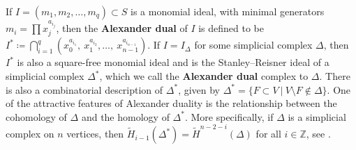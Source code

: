 \documentclass[12pt,leqno]{amsart}
\newtheorem{theorem}[lemma]{Theorem}
\theoremstyle{definition}
\begin{document}
If $I = (m_1, m_2, \dotsc, m_q) \subset S$ is a monomial ideal, with minimal
generators $m_i = \prod x_j^{a_{i_j}}$, then the \textbf{Alexander dual} of
$I$ is defined to be
$I^* \coloneq \bigcap_{i=1}^q (x_0^{a_{i_1}},\ x_1^{a_{i_2}},\dotsc,\
x_{n-1}^{a_{i_{n-1}}})$. If $I = I_\Delta$ for some simplicial complex
$\Delta$, then $I^*$ is also a square-free monomial ideal and is the
Stanley--Reisner ideal of a simplicial complex $\Delta^*$, which we call the
\textbf{Alexander dual} complex to $\Delta$. There is also a combinatorial
description of $\Delta^*$, given by
$\Delta^* = \{ F \subset V \ | \ V \setminus F \not \in \Delta \}$. One of the
attractive features of Alexander duality is the relationship between the
cohomology of $\Delta$ and the homology of $\Delta^*$. More specifically, if
$\Delta$ is a simplicial complex on $n$ vertices, then
$ \widetilde{H}_{i-1}(\Delta^*) = \widetilde{H}^{n-2-i}(\Delta)$ for all
$i \in \mathbb Z$, see \cite[Theorem~5.6]{MS}.
%
%
\end{document}
